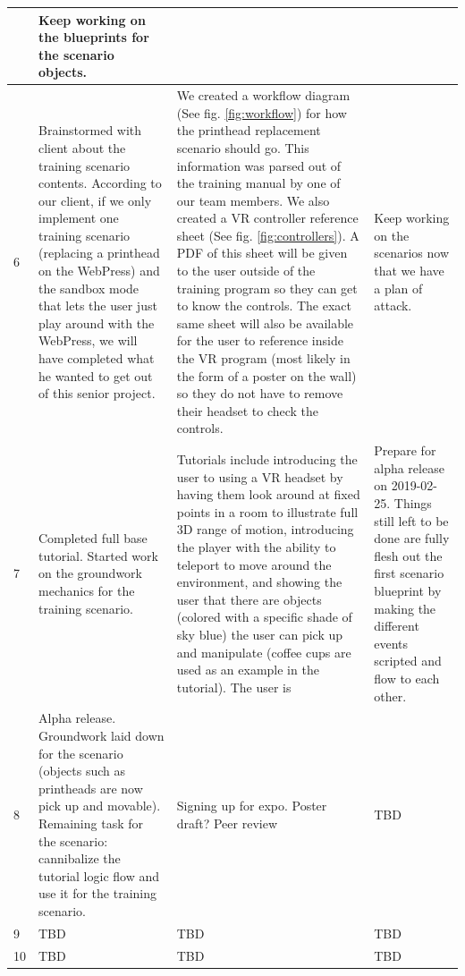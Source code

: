 \documentclass[onecolumn, draftclsnofoot,10pt, compsoc]{IEEEtran}
\begin{document}
\begin{longtable}{ |p{2cm}||p{5cm}|p{5cm}|p{5cm}|  }
    & Keep working on the blueprints for the scenario objects.
    \\
\hline
 6 & Brainstormed with client about the training scenario contents. According to our client, if we only implement one training scenario (replacing a printhead on the WebPress) and the sandbox mode that lets the user just play around with the WebPress, we will have completed what he wanted to get out of this senior project.
    & We created a workflow diagram (See fig. \ref{fig:workflow}) for how the printhead replacement scenario should go. This information was parsed out of the training manual by one of our team members. We also created a VR controller reference sheet (See fig. \ref{fig:controllers}). A PDF of this sheet will be given to the user outside of the training program so they can get to know the controls. The exact same sheet will also be available for the user to reference inside the VR program (most likely in the form of a poster on the wall) so they do not have to remove their headset to check the controls.
    & Keep working on the scenarios now that we have a plan of attack. \\
\hline
 7 & Completed full base tutorial. Started work on the groundwork mechanics for the training scenario.
     & Tutorials include introducing the user to using a VR headset by having them look around at fixed points in a room to illustrate full 3D range of motion, introducing the player with the ability to teleport to move around the environment, and showing the user that there are objects (colored with a specific shade of sky blue) the user can pick up and manipulate (coffee cups are used as an example in the tutorial). The user is
     & Prepare for alpha release on 2019-02-25. Things still left to be done are fully flesh out the first scenario blueprint by making the different events scripted and flow to each other.\\
\hline
 8 & Alpha release. Groundwork laid down for the scenario (objects such as printheads are now pick up and movable). Remaining task for the scenario: cannibalize the tutorial logic flow and use it for the training scenario.
    & Signing up for expo. Poster draft? Peer review
    & TBD\\
\hline
 9 & TBD
     & TBD
     & TBD\\
\hline
 10 & TBD
      & TBD
      & TBD \\
 \hline
\end{longtable}
\end{document}
